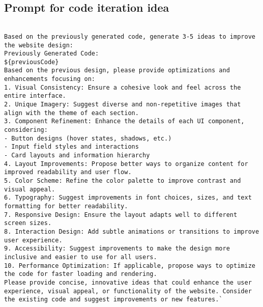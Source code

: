 \subsection{Prompt for code iteration idea}

\begin{lstlisting}

Based on the previously generated code, generate 3-5 ideas to improve the website design:
Previously Generated Code:
${previousCode}
Based on the previous design, please provide optimizations and enhancements focusing on:
1. Visual Consistency: Ensure a cohesive look and feel across the entire interface.
2. Unique Imagery: Suggest diverse and non-repetitive images that align with the theme of each section.
3. Component Refinement: Enhance the details of each UI component, considering:
- Button designs (hover states, shadows, etc.)
- Input field styles and interactions
- Card layouts and information hierarchy
4. Layout Improvements: Propose better ways to organize content for improved readability and user flow.
5. Color Scheme: Refine the color palette to improve contrast and visual appeal.
6. Typography: Suggest improvements in font choices, sizes, and text formatting for better readability.
7. Responsive Design: Ensure the layout adapts well to different screen sizes.
8. Interaction Design: Add subtle animations or transitions to improve user experience.
9. Accessibility: Suggest improvements to make the design more inclusive and easier to use for all users.
10. Performance Optimization: If applicable, propose ways to optimize the code for faster loading and rendering.
Please provide concise, innovative ideas that could enhance the user experience, visual appeal, or functionality of the website. Consider the existing code and suggest improvements or new features.`

\end{lstlisting}